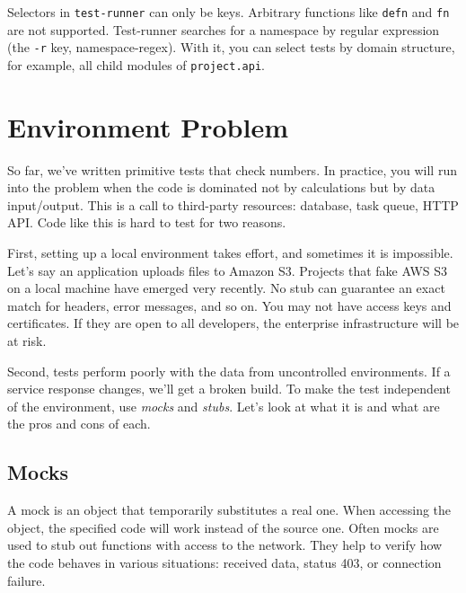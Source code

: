 Selectors in \verb|test-runner| can only be keys. Arbitrary functions like \verb|defn| and \verb|fn| are not supported. Test-runner searches for a namespace by regular expression (the \verb|-r| key, namespace-regex). With it, you can select tests by domain structure, for example, all child modules of \verb|project.api|.

\section{Environment Problem}


So far, we've written primitive tests that check numbers. In practice, you will run into the problem when the code is dominated not by calculations but by data input/output. This is a call to third-party resources: database, task queue, HTTP API. Code like this is hard to test for two reasons.


First, setting up a local environment takes effort, and sometimes it is impossible. Let's say an application uploads files to Amazon S3. Projects that fake AWS S3 on a local machine have emerged very recently. No stub can guarantee an exact match for headers, error messages, and so on. You may not have access keys and certificates. If they are open to all developers, the enterprise infrastructure will be at risk.

Second, tests perform poorly with the data from uncontrolled environments. If a service response changes, we'll get a broken build. To make the test independent of the environment, use \emph{mocks} and \emph{stubs}. Let's look at what it is and what are the pros and cons of each.

\subsection{Mocks}

\label{test-isolation}


A mock is an object that temporarily substitutes a real one. When accessing the object, the specified code will work instead of the source one. Often mocks are used to stub out functions with access to the network. They help to verify how the code behaves in various situations: received data, status 403, or connection failure.

\label{mobile-app-intro}

